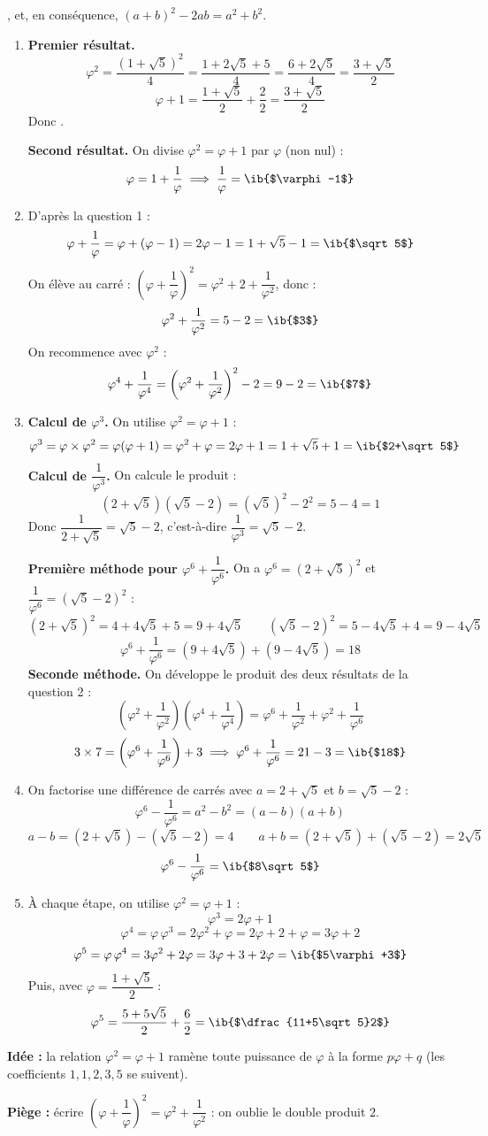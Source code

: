\begin{prop}
,  et, en conséquence, $(a+b)^2-2ab=a^2+b^2$.
\end{prop}
\begin{enumerate}
  \item \textbf{Premier résultat.}
  \[\varphi^2=\dfrac{(1+\sqrt5)^2}4=\dfrac{1+2\sqrt5+5}4=\dfrac{6+2\sqrt5}4=\dfrac{3+\sqrt5}2\]
  \[\varphi+1=\dfrac{1+\sqrt5}2+\dfrac22=\dfrac{3+\sqrt5}2\]
  Donc .

  \textbf{Second résultat.} On divise $\varphi^2=\varphi+1$ par $\varphi$ (non nul) :
  \[\varphi=1+\dfrac1\varphi\implies\dfrac1\varphi=\ib{$\varphi-1$}\]

  \item D'après la question 1 :
  \[\varphi+\dfrac1\varphi=\varphi+(\varphi-1)=2\varphi-1=1+\sqrt5-1=\ib{$\sqrt5$}\]
  On élève au carré : $\left(\varphi+\dfrac1\varphi\right)^2=\varphi^2+2+\dfrac1{\varphi^2}$, donc :
  \[\varphi^2+\dfrac1{\varphi^2}=5-2=\ib{$3$}\]
  On recommence avec $\varphi^2$ :
  \[\varphi^4+\dfrac1{\varphi^4}=\left(\varphi^2+\dfrac1{\varphi^2}\right)^2-2=9-2=\ib{$7$}\]

  \item \textbf{Calcul de $\varphi^3$.} On utilise $\varphi^2=\varphi+1$ :
  \[\varphi^3=\varphi\times\varphi^2=\varphi(\varphi+1)=\varphi^2+\varphi=2\varphi+1=1+\sqrt5+1=\ib{$2+\sqrt5$}\]
  \textbf{Calcul de $\dfrac1{\varphi^3}$.} On calcule le produit :
  \[(2+\sqrt5)(\sqrt5-2)=(\sqrt5)^2-2^2=5-4=1\]
  Donc $\dfrac1{2+\sqrt5}=\sqrt5-2$, c'est-à-dire $\dfrac1{\varphi^3}=\boxed{\sqrt5-2}$.

  \textbf{Première méthode pour $\varphi^6+\dfrac1{\varphi^6}$.} On a $\varphi^6=(2+\sqrt5)^2$ et $\dfrac1{\varphi^6}=(\sqrt5-2)^2$ :
  \[(2+\sqrt5)^2=4+4\sqrt5+5=9+4\sqrt5\qquad(\sqrt5-2)^2=5-4\sqrt5+4=9-4\sqrt5\]
  \[\varphi^6+\dfrac1{\varphi^6}=(9+4\sqrt5)+(9-4\sqrt5)=18\]
  \textbf{Seconde méthode.} On développe le produit des deux résultats de la question 2 :
  \[\left(\varphi^2+\dfrac1{\varphi^2}\right)\left(\varphi^4+\dfrac1{\varphi^4}\right)=\varphi^6+\dfrac1{\varphi^2}+\varphi^2+\dfrac1{\varphi^6}\]
  \[3\times7=\left(\varphi^6+\dfrac1{\varphi^6}\right)+3\implies\varphi^6+\dfrac1{\varphi^6}=21-3=\ib{$18$}\]

  \item On factorise une différence de carrés avec $a=2+\sqrt5$ et $b=\sqrt5-2$ :
  \[\varphi^6-\dfrac1{\varphi^6}=a^2-b^2=(a-b)(a+b)\]
  \[a-b=(2+\sqrt5)-(\sqrt5-2)=4\qquad a+b=(2+\sqrt5)+(\sqrt5-2)=2\sqrt5\]
  \[\varphi^6-\dfrac1{\varphi^6}=\ib{$8\sqrt5$}\]

  \item À chaque étape, on utilise $\varphi^2=\varphi+1$ :
  \[\varphi^3=2\varphi+1\]
  \[\varphi^4=\varphi\,\varphi^3=2\varphi^2+\varphi=2\varphi+2+\varphi=3\varphi+2\]
  \[\varphi^5=\varphi\,\varphi^4=3\varphi^2+2\varphi=3\varphi+3+2\varphi=\ib{$5\varphi+3$}\]
  Puis, avec $\varphi=\dfrac{1+\sqrt5}2$ :
  \[\varphi^5=\dfrac{5+5\sqrt5}2+\dfrac62=\ib{$\dfrac{11+5\sqrt5}2$}\]
\end{enumerate}
\textbf{Idée :} la relation $\varphi^2=\varphi+1$ ramène toute puissance de $\varphi$ à la forme $p\varphi+q$ (les coefficients $1,1,2,3,5$ se suivent).

\textbf{Piège :} écrire $\left(\varphi+\dfrac1\varphi\right)^2=\varphi^2+\dfrac1{\varphi^2}$ : on oublie le double produit $2$.
